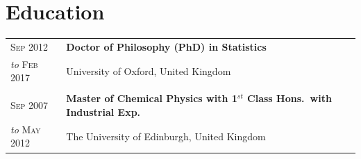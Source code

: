 \section{Education}
\begin{tabular}{>{\raggedleft}p{2.15cm}|p{12cm}}

\textsc{Sep 2012}& \textbf{Doctor of Philosophy (PhD) in Statistics}  \\
\emph{to} \textsc{Feb 2017} & University of Oxford, United Kingdom \\
\multicolumn{2}{c}{}\\

\textsc{Sep 2007}& \textbf{Master of Chemical Physics with 1$^{st}$ Class Hons.~with Industrial Exp.}  \\
\emph{to} \textsc{May 2012} & The University of Edinburgh, United Kingdom \\

\end{tabular}
